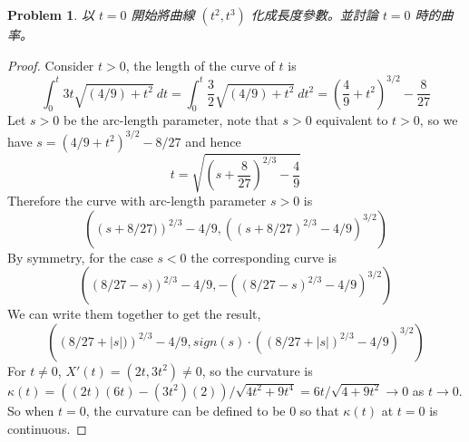 \documentclass[10pt,a4paper]{article}
\newcounter{theProblemCounter}
\newtheorem{problem}[theProblemCounter]{Problem}
\begin{document}
\setcounter{theProblemCounter}{4}
\begin{problem}
以 $t=0$ 開始將曲線 $(t^2, t^3)$ 化成長度參數。並討論 $t=0$ 時的曲率。
\end{problem}

\begin{proof}
Consider $t>0$, the length of the curve of $t$ is
\begin{equation}
\int_0^t 3t\sqrt{(4/9)+t^2}\ dt = \int_0^t \frac32\sqrt{(4/9)+t^2}\ dt^2 = \left(\frac49+t^2\right)^{3/2}-\frac{8}{27}
\end{equation}
Let $s>0$ be the arc-length parameter, note that $s>0$ equivalent to $t>0$, so we have $s=(4/9+t^2)^{3/2}-8/27$ and hence
\begin{equation}
t = \sqrt{\left(s+\frac{8}{27}\right)^{2/3} - \frac{4}{9}}
\end{equation}
Therefore the curve with arc-length parameter $s>0$ is
\begin{equation}
\left(\left(s+8/27)\right)^{2/3} - 4/9, 
\left(\left(s+8/27\right)^{2/3} - 4/9\right)^{3/2}\right)
\end{equation}
By symmetry, for the case $s<0$ the corresponding curve is
\begin{equation}
\left(\left(8/27-s)\right)^{2/3} - 4/9, 
-\left(\left(8/27-s\right)^{2/3} - 4/9\right)^{3/2}\right)
\end{equation}
We can write them together to get the result,
\begin{equation}
\left(\left(8/27+|s|)\right)^{2/3} - 4/9, 
sign(s)\cdot\left(\left(8/27+|s|\right)^{2/3} - 4/9\right)^{3/2}\right)
\end{equation}
For $t\ne 0$, $X'(t)=(2t, 3t^2)\ne 0$, so the curvature is
$\kappa(t)=((2t)(6t)-(3t^2)(2)) / \sqrt{4t^2+9t^4} = 6t / \sqrt{4+9t^2} \to 0$ as $t\to 0$. So when $t=0$, the curvature can be defined to be 0 so that $\kappa(t)$ at $t=0$ is continuous.
\end{proof}
\end{document}
